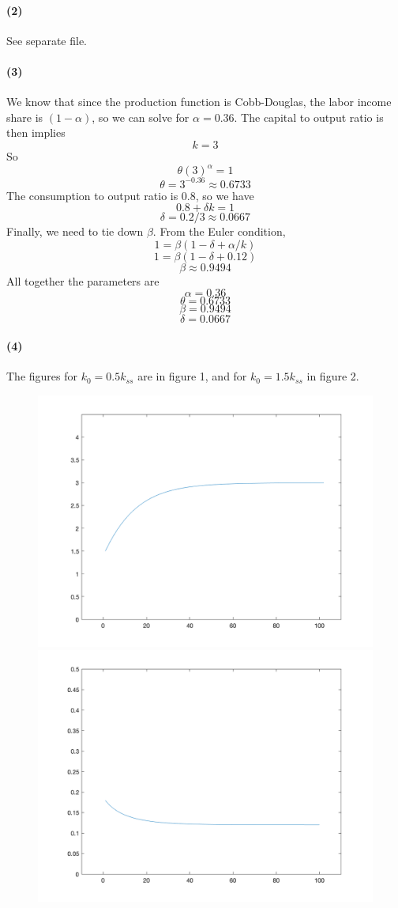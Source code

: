 \documentclass[10pt,letter]{article}
\newcommand{\problempart}[1]{\paragraph{#1}}
\begin{document}
\problempart{(2)} See separate file.
\problempart{(3)}
We know that since the production function is Cobb-Douglas, the labor income share is $(1-\alpha)$, so we can solve for $\alpha = 0.36$. The capital to output ratio is then implies
\[ k = 3 \]
So
\[ \theta (3)^\alpha = 1 \]
\[ \theta = 3^{-0.36} \approx 0.6733 \]
The consumption to output ratio is 0.8, so we have
\[ 0.8 + \delta k = 1 \]
\[ \delta = 0.2 / 3 \approx 0.0667\]
Finally, we need to tie down $\beta$. From the Euler condition,
\[ 1 = \beta (1 - \delta + \alpha/k) \]
\[ 1 = \beta (1 - \delta + 0.12) \]
\[ \beta \approx 0.9494 \]
All together the parameters are
\[ \alpha = 0.36 \]
\[ \theta = 0.6733 \]
\[ \beta = 0.9494 \]
\[ \delta = 0.0667\]
\problempart{(4)} The figures for $k_0 = 0.5k_{ss}$ are in figure 1, and for $k_0 = 1.5k_{ss}$ in figure 2.
\begin{figure}
\includegraphics[scale=0.2]{ps2q3_4k1}
\includegraphics[scale=0.2]{ps2q3_4r_k1}

\end{figure}
\end{document}

